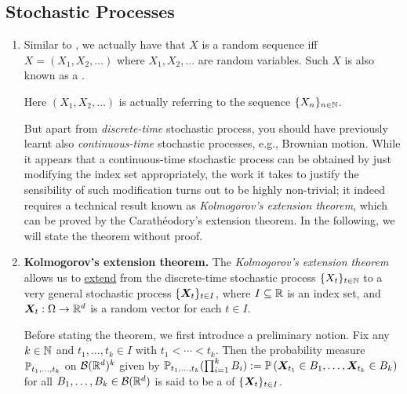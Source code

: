 \subsection{Stochastic Processes}
\begin{enumerate}
\item Similar to , we actually have that \(X\) is
a random sequence iff \(X=(X_1,X_2,\dotsc)\) where \(X_1,X_2,\dotsc\) are
random variables. Such \(X\) is also known as a .
\begin{note}
Here \((X_1,X_2,\dotsc)\) is actually referring to the sequence \(\{X_n\}_{n\in\mathbb{N}}\).
\end{note}

But apart from \emph{discrete-time} stochastic process, you should have
previously learnt also \emph{continuous-time} stochastic processes, e.g.,
Brownian motion. While it appears that a continuous-time stochastic process can
be obtained by just modifying the index set appropriately, the work it takes to
justify the sensibility of such modification turns out to be highly
non-trivial; it indeed requires a technical result known as
\emph{Kolmogorov's extension theorem}, which can be proved by the
Carath\'eodory's extension theorem. In the following, we will state the theorem
without proof.

\item \textbf{Kolmogorov's extension theorem.} The \emph{Kolmogorov's extension
theorem} allows us to \underline{extend} from the discrete-time stochastic
process \(\{X_t\}_{t\in\mathbb{N}}\) to a very general stochastic process
\(\{\bm{X}_t\}_{t\in I}\), where \(I\subseteq \mathbb{R}\) is an index set, and
\(\bm{X}_t:\Omega\to\mathbb{R}^d\) is a random vector for each \(t\in I\).

Before stating the theorem, we first introduce a preliminary notion. Fix any
\(k\in\mathbb{N}\) and \(t_1,\dotsc,t_k\in I\) with \(t_1<\dotsb<t_k\). Then the
probability measure \(\mathbb{P}_{t_1,\dotsc,t_k}\) on \(\mathcal{B}(\mathbb{R}^d)^{k}\) given
by \(\mathbb{P}_{t_1,\dotsc,t_k}(\prod_{i=1}^{k}B_i) :=\mathbb{P}\left(\bm{X}_{t_1}\in
B_1,\dotsc,\bm{X}_{t_k}\in B_k\right)\) for all
\(B_1,\dotsc,B_k\in\mathcal{B}(\mathbb{R}^d)\) is said to be a  of \(\{\bm{X}_t\}_{t\in I}\).


\end{enumerate}
